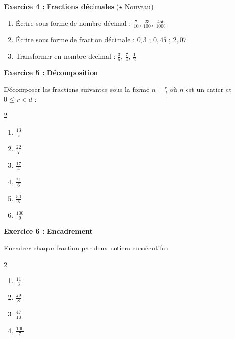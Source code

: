 \begin{exercisebox}
	\textbf{Exercice 4 : Fractions décimales} ($\star$ Nouveau)
	
	\begin{enumerate}[label=\alph*)]
		\item Écrire sous forme de nombre décimal : $\frac{7}{10}$, $\frac{23}{100}$, $\frac{456}{1000}$
		\item Écrire sous forme de fraction décimale : $0,3$ ; $0,45$ ; $2,07$
		\item Transformer en nombre décimal : $\frac{3}{5}$, $\frac{7}{4}$, $\frac{1}{2}$
	\end{enumerate}
	
	\textbf{Exercice 5 : Décomposition}
	
	Décomposer les fractions suivantes sous la forme $n + \frac{r}{d}$ où $n$ est un entier et $0 \leq r < d$ :
	\begin{multicols}{2}
		\begin{enumerate}[label=\alph*)]
			\item $\frac{13}{5}$
			\item $\frac{22}{7}$
			\item $\frac{17}{4}$
			\item $\frac{31}{6}$
			\item $\frac{50}{8}$
			\item $\frac{100}{9}$
		\end{enumerate}
	\end{multicols}
	
	\textbf{Exercice 6 : Encadrement}
	
	Encadrer chaque fraction par deux entiers consécutifs :
	\begin{multicols}{2}
		\begin{enumerate}[label=\alph*)]
			\item $\frac{11}{3}$
			\item $\frac{29}{8}$
			\item $\frac{47}{10}$
			\item $\frac{100}{7}$
		\end{enumerate}
	\end{multicols}
	
\end{exercisebox}


